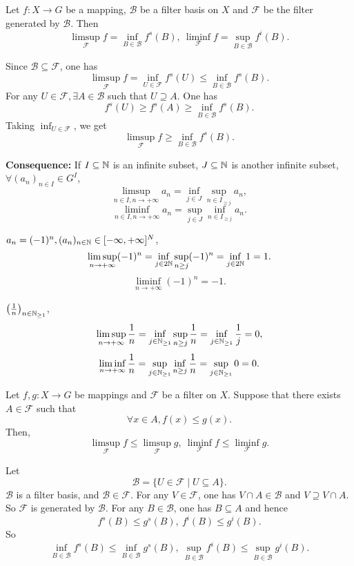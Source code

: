 \begin{propositionenv}
    Let $f:X\longrightarrow G$ be a mapping, $\mathcal{B}$ be a filter basis on $X$ and $\mathcal{F}$ be the filter generated by $\mathcal{B}$. Then
    $$\limsup _{\mathcal{F}}f=\inf_{B\in \mathcal{B}}f^s(B),\ \liminf _{\mathcal{F}}f=\sup_{B\in \mathcal{B}}f^i(B).$$
\end{propositionenv}
\begin{proofenv}
    Since $\mathcal{B}\subseteq \mathcal{F}$, one has 
    $$\limsup_{\mathcal{F}}f=\inf_{U\in \mathcal{F}}f^s(U)\le \inf_{B\in \mathcal{B}}f^s(B).$$
    For any $U\in \mathcal{F},\exists A\in \mathcal{B}$ such that $U\supseteq A$. One has
    $$f^s(U)\ge f^s(A)\ge \inf_{B\in \mathcal{B}}f^s(B).$$
    Taking $\inf_{U\in \mathcal{F}}$, we get
    $$\limsup_{\mathcal{F}}f\ge \inf_{B\in \mathcal{B}}f^s(B).$$
\end{proofenv}
\begin{box2}
\textbf{Consequence:} \quad If $I\subseteq\mathbb{N}$ is an infinite subset, $J\subseteq \mathbb{N}$ is another infinite subset, $\forall (a_n)_{n\in I}\in G^I$,
$$\limsup_{n\in I,n\rightarrow+\infty}a_n=\inf_{j\in J}\sup_{n\in I_{\ge j}}a_n,$$
$$\liminf_{n\in I,n\rightarrow+\infty}a_n=\sup_{j\in J}\inf_{n\in I_{\ge j}}a_n.$$
\end{box2}
\begin{exampleenv}
     $a_n=(-1)^n, (a_n)_{n\in \mathbb{N}}\in [-\infty,+\infty]^N$,
     $$\limsup_{n\rightarrow +\infty}(-1)^n=\inf_{j\in 2\mathbb{N}}\sup_{n\ge j}(-1)^n=\inf_{j\in 2\mathbb{N}}1=1.$$
     $$\liminf_{n\rightarrow+\infty}(-1)^n=-1.$$
\end{exampleenv}
\begin{exampleenv}
    $\left(\frac{1}{n}\right)_{n\in \mathbb{N}_{\ge 1}}$,
    $$\limsup_{n\rightarrow+\infty}\frac{1}{n}=\inf_{j\in \mathbb{N}_{\ge 1}}\sup_{n\ge j}\frac{1}{n}=\inf_{j\in \mathbb{N}_{\ge 1}}\frac{1}{j}=0,$$
    $$\liminf_{n\rightarrow+\infty}\frac{1}{n}=\sup_{j\in \mathbb{N}_{\ge 1}}\inf_{n\ge j}\frac{1}{n}=\sup_{j\in \mathbb{N}_{\ge 1}}0=0.$$
\end{exampleenv}
\begin{propositionenv}
    Let $f,g:X\longrightarrow G$ be mappings and $\mathcal{F}$ be a filter on $X$. Suppose that there exists $A\in \mathcal{F}$ such that 
    $$\forall x\in A, f(x)\le g(x).$$
    Then,
    $$\limsup_{\mathcal{F}}f\le \limsup_{\mathcal{F}}g,\ \liminf_{\mathcal{F}}f\le \liminf_{\mathcal{F}}g.$$ 
\end{propositionenv}
\begin{proofenv}
    Let 
    $$\mathcal{B}=\{U\in \mathcal{F}\mid  U\subseteq A\}.$$
    $\mathcal{B}$ is a filter basis, and $\mathcal{B}\in \mathcal{F}$. For any $V\in \mathcal{ F}$, one has $V\cap A\in \mathcal{B}$ and $V\supseteq V\cap A$. So $\mathcal{F}$ is generated by $\mathcal{ B}$. For any $B\in \mathcal{B}$, one has $B\subseteq A$ and hence
    $$f^s(B)\le g^s(B),\ f^i(B)\le g^i(B).$$
    So 
    $$\inf_{B\in \mathcal{B}}f^s(B)\le \inf_{B\in \mathcal{B}}g^s(B),\ \sup_{B\in \mathcal{B}}f^i(B)\le \sup_{B\in \mathcal{B}}g^i(B).$$
\end{proofenv}
